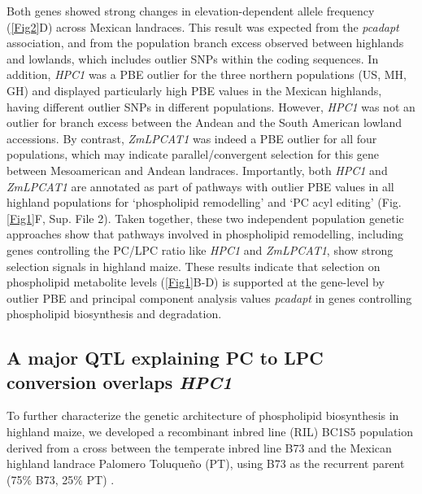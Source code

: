 \documentclass[9pt,twocolumn,twoside,lineno]{biorxiv}
\newcommand{\hpc}{\textit{HPC1}\xspace}
\begin{document}
Both genes showed strong changes in elevation-dependent allele frequency (\cref{Fig2}D) across Mexican landraces.
This result was expected from the \textit{pcadapt} association, and from the population branch excess observed between highlands and lowlands, which includes outlier SNPs within the coding sequences. 
In addition, \hpc was a PBE outlier for the three northern populations (US, MH, GH) and displayed particularly high PBE values in the Mexican highlands, having different outlier SNPs in different populations.
However, \hpc was not an outlier for branch excess between the Andean and the South American lowland accessions.
By contrast, \textit{ZmLPCAT1} was indeed a PBE outlier for all four populations, which may indicate parallel/convergent selection for this gene between Mesoamerican and Andean landraces.
Importantly, both \hpc and \textit{ZmLPCAT1} are annotated as part of pathways with outlier PBE values in all highland populations for ‘phospholipid remodelling’ and ‘PC acyl editing’ (Fig.\cref{Fig1}F, Sup. File 2). 
Taken together, these two independent population genetic approaches show that pathways involved in phospholipid remodelling,  including genes controlling the PC/LPC ratio like \hpc and \textit{ZmLPCAT1}, show strong selection signals in highland maize. 
These results indicate that selection on phospholipid metabolite levels (\cref{Fig1}B-D) is supported at the gene-level by outlier PBE and principal component analysis values \textit{pcadapt} in genes controlling phospholipid biosynthesis and degradation.

\subsection{A major QTL explaining PC to LPC conversion overlaps \hpc}
To further characterize the genetic architecture of phospholipid biosynthesis in highland maize, we developed a recombinant inbred line (RIL) BC1S5 population derived from a cross between the temperate inbred line B73 and the Mexican highland landrace Palomero Toluqueño (PT), using B73 as the recurrent parent (75\% B73, 25\% PT) \cite{Perez-Limon2022-lg}.
\end{document}
